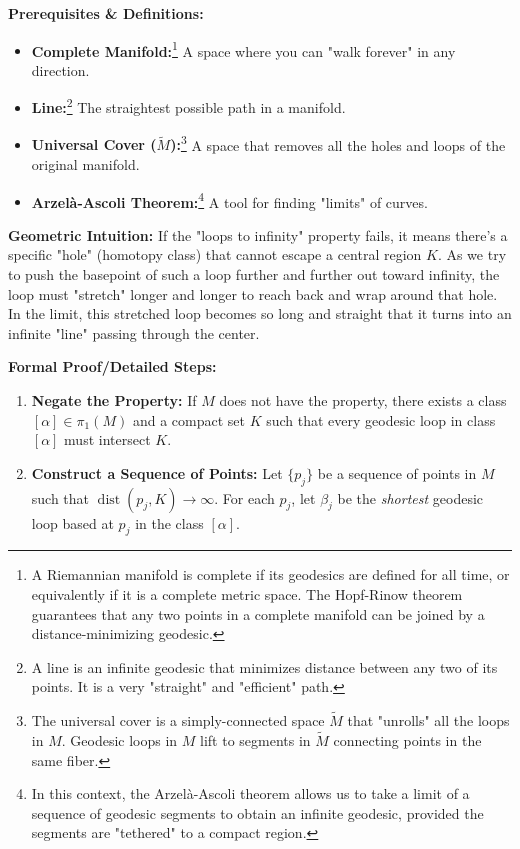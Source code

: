 \begin{solution}
\textbf{Prerequisites \& Definitions:}
\begin{itemize}
    \item \textbf{Complete Manifold:}\footnote{A Riemannian manifold is complete if its geodesics are defined for all time, or equivalently if it is a complete metric space. The Hopf-Rinow theorem guarantees that any two points in a complete manifold can be joined by a distance-minimizing geodesic.} A space where you can "walk forever" in any direction.
    \item \textbf{Line:}\footnote{A line is an infinite geodesic that minimizes distance between any two of its points. It is a very "straight" and "efficient" path.} The straightest possible path in a manifold.
    \item \textbf{Universal Cover ($\widetilde{M}$):}\footnote{The universal cover is a simply-connected space $\widetilde{M}$ that "unrolls" all the loops in $M$. Geodesic loops in $M$ lift to segments in $\widetilde{M}$ connecting points in the same fiber.} A space that removes all the holes and loops of the original manifold.
    \item \textbf{Arzelà-Ascoli Theorem:}\footnote{In this context, the Arzelà-Ascoli theorem allows us to take a limit of a sequence of geodesic segments to obtain an infinite geodesic, provided the segments are "tethered" to a compact region.} A tool for finding "limits" of curves.
\end{itemize}

\textbf{Geometric Intuition:}
If the "loops to infinity" property fails, it means there's a specific "hole" (homotopy class) that cannot escape a central region $K$. As we try to push the basepoint of such a loop further and further out toward infinity, the loop must "stretch" longer and longer to reach back and wrap around that hole. In the limit, this stretched loop becomes so long and straight that it turns into an infinite "line" passing through the center.

\textbf{Formal Proof/Detailed Steps:}
\begin{enumerate}
    \item \textbf{Negate the Property:}
    If $M$ does not have the property, there exists a class $[\alpha] \in \pi_1(M)$ and a compact set $K$ such that every geodesic loop in class $[\alpha]$ must intersect $K$.
    
    \item \textbf{Construct a Sequence of Points:}
    Let $\{p_j\}$ be a sequence of points in $M$ such that $\operatorname{dist}(p_j, K) \to \infty$. For each $p_j$, let $\beta_j$ be the \textit{shortest} geodesic loop based at $p_j$ in the class $[\alpha]$.
    

\end{enumerate}
\end{solution}
